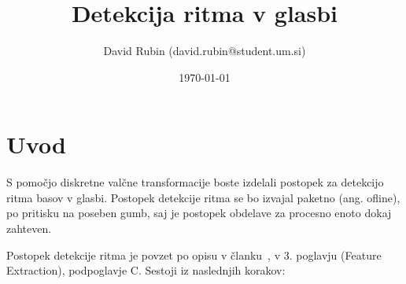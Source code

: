 \documentclass[a4paper,11pt]{article}
\title{Detekcija ritma v glasbi}
\author{David Rubin (david.rubin@student.um.si)}
\date{\today}
\begin{document}
\maketitle

\section{Uvod}

S pomočjo diskretne valčne transformacije boste izdelali  postopek za detekcijo ritma basov v glasbi. Postopek detekcije ritma se bo izvajal paketno (ang. ofline), po pritisku na poseben gumb, saj je postopek obdelave za procesno enoto dokaj zahteven. 

Postopek detekcije ritma je povzet po opisu v članku~\cite{tzanetakis2002musical}, v 3. poglavju (Feature Extraction), podpoglavje C. Sestoji iz naslednjih korakov:
\end{document}
